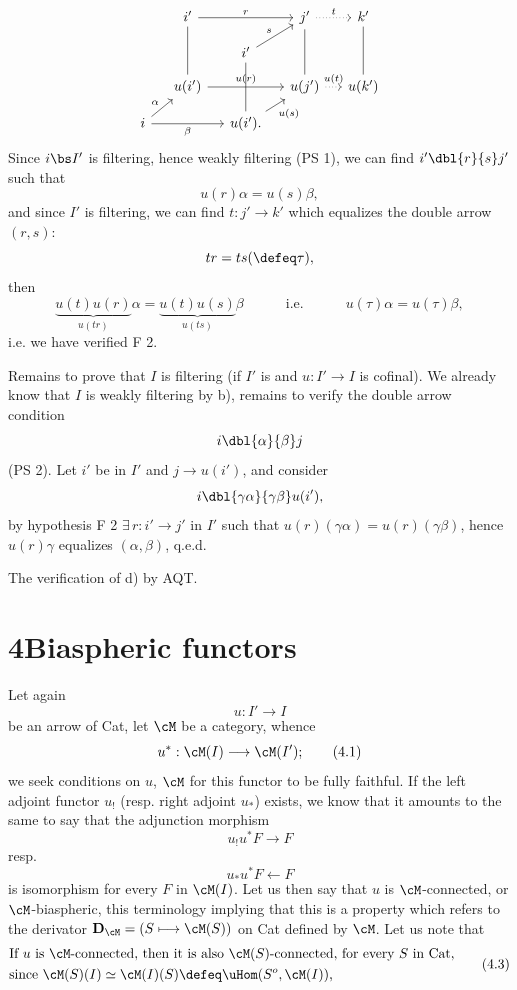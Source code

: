 \[
\begin{tikzcd}[row sep=small, column sep=small]
& i' \arrow[rr, "r"] \arrow[dd, dash] & & j' \arrow[r, dotted, "t"] \arrow[dd, dash] & k' \arrow[dd, dash] \\
& & i' \arrow[ur, "s"] \arrow[dd, dash] & & \\
& u(i') \arrow[rr, "u(r)"] & & u(j') \arrow[r, dotted, "u(t)"] & u(k') \\
i \arrow[ur, "\alpha"] \arrow[rr, "\beta"'] & & u(i'). \arrow[ur, "u(s)"'] & &
\end{tikzcd}
\]
Since $i\bs I'$ is filtering, hence weakly filtering (PS 1), we can find $i' \dbl{r}{s} j'$ such that
\[
u(r)\alpha = u(s)\beta,
\]
and since $I'$ is filtering, we can find $t : j' \longrightarrow k'$ which equalizes the double arrow $(r, s)$:
\[
tr = ts(\defeq \tau),
\]
then
\[
\underbrace{u(t)u(r)}_{u(tr)}\alpha = \underbrace{u(t)u(s)}_{u(ts)}\beta \qquad\quad \text{i.e.} \qquad\quad u(\tau)\alpha = u(\tau)\beta,
\]
i.e. we have verified F 2.

Remains to prove that $I$ is filtering (if $I'$ is and $u : I' \longrightarrow I$ is cofinal). We already know that $I$ is weakly filtering by b), remains to verify the double arrow condition
\[
i \dbl{\alpha}{\beta} j
\]
(PS 2). Let $i'$ be in $I'$ and $j \longrightarrow u(i')$, and consider
\[
i \dbl{\gamma\alpha}{\gamma\beta} u(i'),
\]
by hypothesis F 2 $\exists\, r : i' \longrightarrow j'$ in $I'$ such that
$u(r)(\gamma\alpha) = u(r)(\gamma\beta)$, hence $u(r)\gamma$ equalizes $(\alpha, \beta)$, q.e.d.

The verification of d) by AQT.

\section*{4\quad Biaspheric functors}

Let again
\[
u : I' \longrightarrow I
\]
be an arrow of Cat, let $\cM$ be a category, whence
\[
u^* : \cM(I) \longrightarrow \cM(I');
\tag*{(4.1)}
\]
we seek conditions on $u$, $\cM$ for this functor to be fully faithful. If the left adjoint functor $u_!$ (resp. right adjoint $u_*$) exists, we know that it amounts to the same to say that the adjunction morphism
\[
u_!u^*F \longrightarrow F
\tag*{(4.2)}
\]
resp.
\[
u_*u^*F \longleftarrow F
\tag*{(4.2 bis)}
\]
is isomorphism for every $F$ in $\cM(I)$. Let us then say that $u$ is $\cM$-connected, or $\cM$-biaspheric, this terminology implying that this is a property which refers to the derivator $\mathbf{D}_{\cM} = (S \longmapsto \cM(S))$ on Cat defined by $\cM$. Let us note that
\[
\begin{aligned}
&\text{If $u$ is $\cM$-connected, then it is also $\cM(S)$-connected, for every $S$ in Cat,}\\
&\text{since $\cM(S)(I) \simeq \cM(I)(S) \defeq \uHom(S^o, \cM(I))$,}
\end{aligned}
\tag*{(4.3)}
\]

